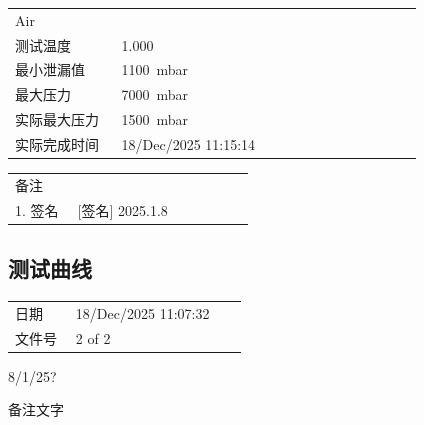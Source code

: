 \documentclass[UTF8,10pt,a4paper,fontset=fandol]{ctexart}
\newcommand{\fieldvalue}[1]{#1}
\newcommand{\handwritten}[1]{#1}
\begin{document}
\begin{tabular}{@{}p{0.24\linewidth}p{0.68\linewidth}@{}}
\fieldvalue{Air}
\\
测试温度 &
\fieldvalue{1.000}
\\
最小泄漏值 &
\fieldvalue{1100\ mbar}
\\
最大压力 &
\fieldvalue{7000\ mbar}
\\
实际最大压力 &
\fieldvalue{1500\ mbar}
\\
实际完成时间 &
\fieldvalue{18/Dec/2025 11:15:14}
\\
\end{tabular}

\vspace{1em}

\begin{tabular}{@{}p{0.24\linewidth}p{0.68\linewidth}@{}}
备注 & \\
1. 签名 &
\fieldvalue{\handwritten{[签名] 2025.1.8}}
\\
\end{tabular}

\subsection{测试曲线}

\noindent

\vspace{0.5em}

\begin{tabular}{@{}p{0.24\linewidth}p{0.68\linewidth}@{}}
日期 &
\fieldvalue{18/Dec/2025 11:07:32}
\\
文件号 &
\fieldvalue{2 of 2}
\\
\end{tabular}

\handwritten{8/1/25?}

\handwritten{备注文字}
\end{document}
